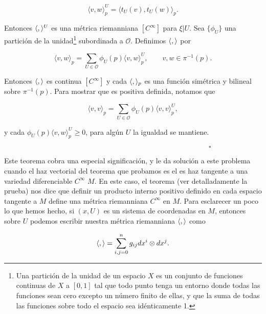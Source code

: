 \documentclass[a4paper,10pt]{article}
\numberwithin{equation}{section}
\begin{document}
\begin{equation}
 \langle v, w \rangle_p^U = \langle t_U(v),t_U(w)\rangle_p.
\end{equation}

Entonces $\langle \space , \space \rangle^U$ es una métrica riemanniana
$[C^\infty]$ para $\xi|U$. Sea $\{\phi_U \}$ una partición de la unidad\footnote{ Una partición 
de la unidad de un espacio $X$ es un conjunto de funciones continuas de $X$ a $[0,1]$ tal que todo punto 
tenga un entorno donde todas las funciones sean cero excepto un número finito de ellas, y que la 
suma de todas las funciones sobre todo el espacio sea idénticamente 1.} 
subordinada a $\mathcal{O}$. Definimos $\langle \space, \space \rangle$ por 

\begin{equation}
 \langle v, w \rangle_p = \sum_{U \in \mathcal{O}} \phi_U(p)\langle v, w \rangle_p^U, 
 \qquad v,w \in \pi^{-1}(p).
\end{equation}

Entonces $\langle \space, \space \rangle$ es continua $[C^\infty]$ y 
cada $\langle \space, \space \rangle_p$ es una función simétrica y 
bilineal sobre $\pi^{-1}(p)$. Para mostrar que es positiva definida, 
notamos que 

\begin{equation}
 \langle v, v \rangle_p =  \sum_{U \in \mathcal{O}} \phi_U(p)\langle v, v \rangle_p^U,
\end{equation}

y cada $\phi_U(p)\langle v, w \rangle_p^U \geq 0$, para algún $U$ la igualdad 
se mantiene.

$\hspace{12cm} \square$

Este teorema cobra una especial significación, y le da solución a este
problema cuando el haz vectorial del teorema que probamos es el es haz 
tangente a una variedad diferenciable $C^\infty$ $M$. En este caso, 
el teorema (ver detalladamente la prueba) nos dice que definir un producto 
interno positivo definido en cada espacio tangente a $M$ define una 
métrica riemanniana $C^\infty$ en $M$. Para esclarecer un poco lo que hemos hecho,
si $(x,U)$ es un sistema de coordenadas en $M$, entonces sobre $U$ podemos 
escribir nuestra métrica riemanniana $\langle \space, \space \rangle$ como 

\begin{equation}
 \langle \space , \space \rangle = \sum_{i,j = 0}^n g_{ij}dx^i \otimes dx^j.
\end{equation}
\end{document}
